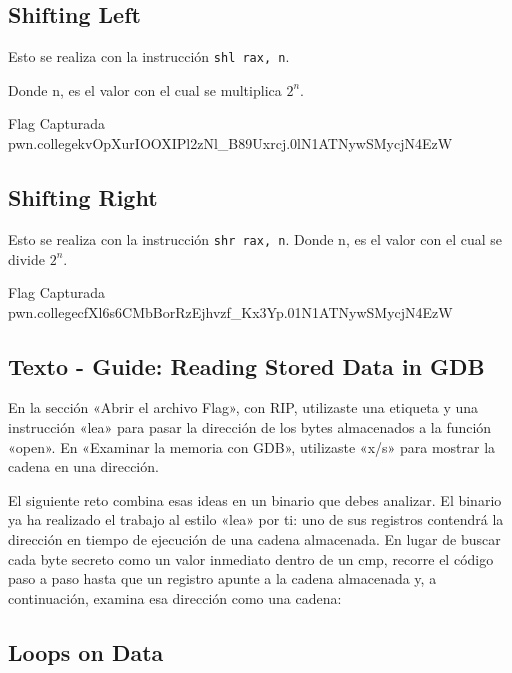 \subsection{Shifting Left}\label{subsec:shifting_left}
Esto se realiza con la instrucción \texttt{shl rax, n}.

Donde n, es el valor con el cual se multiplica \( 2^n \).

\begin{flagbox}{Flag Capturada}
	pwn.college{kvOpXurIOOXIPl2zNl_B89Uxrcj.0lN1ATNywSMycjN4EzW}
\end{flagbox}

\subsection{Shifting Right}\label{subsec:shifting_right}
Esto se realiza con la instrucción \texttt{shr rax, n}.
Donde n, es el valor con el cual se divide \( 2^n \).
\begin{flagbox}{Flag Capturada}
	pwn.college{cfXl6s6CMbBorRzEjhvzf_Kx3Yp.01N1ATNywSMycjN4EzW}
\end{flagbox}

\subsection{Texto - Guide: Reading Stored Data in GDB}\label{subsec:texto_guide_reading_a_stored_data_in_gdb}

En la sección «Abrir el archivo Flag», con RIP, utilizaste una etiqueta y una
instrucción «lea» para pasar la dirección de los bytes almacenados a la función
«open». En «Examinar la memoria con GDB», utilizaste «x/s» para mostrar la cadena en una dirección.

El siguiente reto combina esas ideas en un binario que debes analizar. El binario
ya ha realizado el trabajo al estilo «lea» por ti: uno de sus registros contendrá
la dirección en tiempo de ejecución de una cadena almacenada. En lugar de buscar
cada byte secreto como un valor inmediato dentro de un cmp, recorre el código
paso a paso hasta que un registro apunte a la cadena almacenada y, a continuación, examina esa dirección como una cadena:



\subsection{Loops on Data}\label{subsec:loops_on_data}

